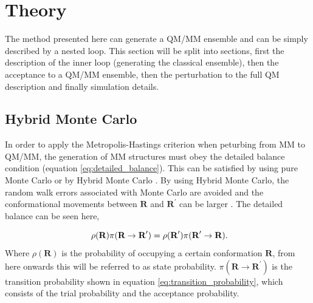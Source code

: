 
\section{Theory}

The method presented here can generate a QM/MM ensemble and can be simply described by a nested loop.  This section will be split into sections, first the description of the inner loop (generating the classical ensemble), then the acceptance to a QM/MM ensemble, then the perturbation to the full QM description and finally simulation details.

\subsection{Hybrid Monte Carlo}

In order to apply the Metropolis-Hastings criterion when peturbing from MM to QM/MM, the generation of MM structures must obey the detailed balance condition (equation \ref{eq:detailed_balance}).  This can be satisfied by using pure Monte Carlo or by Hybrid Monte Carlo \cite{hybrid_mc}.  By using Hybrid Monte Carlo, the random walk errors associated with Monte Carlo are avoided and the conformational movements between $\textbf{R}$ and $\textbf{R}^{\prime}$ can be larger \cite{hybrid_mc_condensed_matter}.  The detailed balance can be seen here,

\begin{equation} \label{eq:detailed_balance}
\ \rho(\textbf{R})\pi(\textbf{R}\rightarrow\textbf{R}^{\prime})=\rho(\textbf{R}^{\prime})\pi(\textbf{R}^{\prime}\rightarrow\textbf{R}) \\.
\end{equation}
%
Where $\rho(\textbf{R})$ is the probability of occupying a certain conformation $\textbf{R}$, from here onwards this will be referred to as state probability.  $\pi(\textbf{R}\rightarrow\textbf{R}^{\prime})$ is the transition probability shown in equation \ref{eq:transition_probability}, which consists of the trial probability and the acceptance probability.

